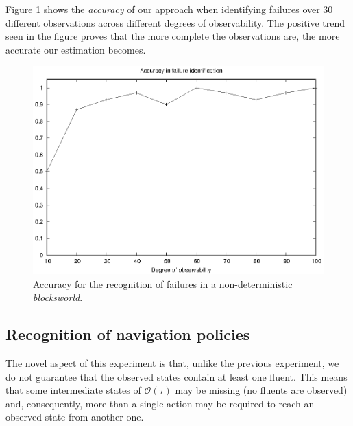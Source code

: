 \documentclass[letterpaper]{article} %
\begin{document}
Figure \ref{fig:blocks_acc} shows the {\em accuracy} of our approach when identifying failures over 30 different observations across different degrees of observability. The positive trend seen in the figure proves that the more complete the observations are, the more accurate our estimation becomes.






\begin{figure}
	\centering
	\includegraphics[width=0.9\linewidth]{figures/blocks.eps}
	\caption{Accuracy for the recognition of failures in a non-deterministic {\em blocksworld}.}
	\label{fig:blocks_acc}
\end{figure}



\subsection{Recognition of navigation policies}
The novel aspect of this experiment is that, unlike the previous experiment, we do not guarantee that the observed states contain at least one fluent. This means that some intermediate states of $\mathcal{O}(\tau)$ may be missing (no fluents are observed) and, consequently, more than a single action may be required to reach an observed state from another one.
\end{document}
